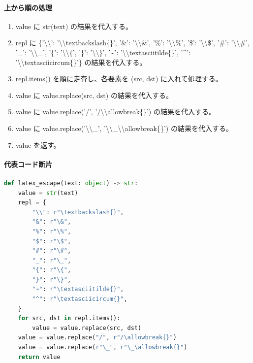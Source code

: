\documentclass[a4paper,11pt]{article}
\begin{document}
            \paragraph{上から順の処理}
            \begin{enumerate}[leftmargin=1.8em]
            \item value に str(text) の結果を代入する。
\item repl に \{'\textbackslash{}\textbackslash{}': '\textbackslash{}\textbackslash{}textbackslash\{\}', '\&': '\textbackslash{}\textbackslash{}\&', '\%': '\textbackslash{}\textbackslash{}\%', '\$': '\textbackslash{}\textbackslash{}\$', '\#': '\textbackslash{}\textbackslash{}\#', '\_': '\textbackslash{}\textbackslash{}\_', '\{': '\textbackslash{}\textbackslash{}\{', '\}': '\textbackslash{}\textbackslash{}\}', '\textasciitilde{}': '\textbackslash{}\textbackslash{}textasciitilde\{\}', '\textasciicircum{}': '\textbackslash{}\textbackslash{}textasciicircum\{\}'\} の結果を代入する。
\item repl.items() を順に走査し、各要素を (src, dst) に入れて処理する。
\item   value に value.replace(src, dst) の結果を代入する。
\item value に value.replace('/', '/\textbackslash{}\textbackslash{}allowbreak\{\}') の結果を代入する。
\item value に value.replace('\textbackslash{}\textbackslash{}\_', '\textbackslash{}\textbackslash{}\_\textbackslash{}\textbackslash{}allowbreak\{\}') の結果を代入する。
\item value を返す。
            \end{enumerate}
            \paragraph{代表コード断片}
            \begin{lstlisting}[language=Python]
def latex_escape(text: object) -> str:
    value = str(text)
    repl = {
        "\\": r"\textbackslash{}",
        "&": r"\&",
        "%": r"\%",
        "$": r"\$",
        "#": r"\#",
        "_": r"\_",
        "{": r"\{",
        "}": r"\}",
        "~": r"\textasciitilde{}",
        "^": r"\textasciicircum{}",
    }
    for src, dst in repl.items():
        value = value.replace(src, dst)
    value = value.replace("/", r"/\allowbreak{}")
    value = value.replace(r"\_", r"\_\allowbreak{}")
    return value
\end{lstlisting}
\end{document}
